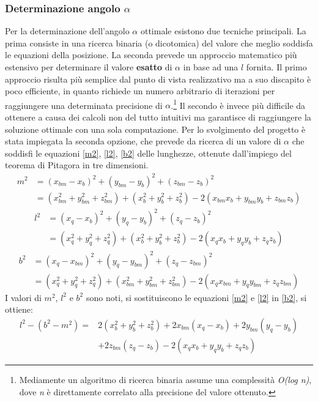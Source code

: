 \documentclass[12pt,twoside,openright]{article}
\begin{document}
\subsubsection{Determinazione angolo \boldmath$\alpha$}\label{determinazionealfa}
Per la determinazione dell'angolo $\alpha$ ottimale esistono due tecniche principali. La prima consiste in una ricerca binaria (o dicotomica) del valore che meglio soddisfa le equazioni della posizione. La seconda prevede un approccio matematico più estensivo per determinare il valore \textbf{esatto} di $\alpha$ in base ad una $l$ fornita.\cite{calcolostewart1}\cite{calcolostewart2} Il primo approccio risulta più semplice dal punto di vista realizzativo ma a suo discapito è poco efficiente, in quanto richiede un numero arbitrario di iterazioni per raggiungere una determinata precisione di $\alpha$.\footnote{Mediamente un algoritmo di ricerca binaria assume una complessità \emph{O(log n)}, dove \emph{n} è direttamente correlato alla precisione del valore ottenuto.} Il secondo è invece più difficile da ottenere a causa dei calcoli non del tutto intuitivi ma garantisce di raggiungere la soluzione ottimale con una sola computazione. Per lo svolgimento del progetto è stata impiegata la seconda opzione, che prevede da ricerca di un valore di $\alpha$ che soddisfi le equazioni \eqref{m2}, \eqref{l2}, \eqref{b2} delle lunghezze, ottenute dall'impiego del teorema di Pitagora in tre dimensioni.
\begin{align}\label{m2}
    m^2 &= (x_{bm}-x_b)^2+(y_{bm}-y_b)^2+(z_{bm}-z_b)^2\nonumber\\
    		&= (x_{bm}^2+y_{bm}^2+z_{bm}^2)+(x_{b}^2+y_{b}^2+z_{b}^2)-2(x_{bm}x_b+y_{bm}y_b+z_{bm}z_b)
\end{align}
\begin{align}\label{l2}
    l^2 &= (x_{q}-x_b)^2+(y_{q}-y_b)^2+(z_{q}-z_b)^2\nonumber\\
    		&= (x_{q}^2+y_{q}^2+z_{q}^2)+(x_{b}^2+y_{b}^2+z_{b}^2)-2(x_{q}x_b+y_{q}y_b+z_{q}z_b)
\end{align}
\begin{align}\label{b2}
    b^2 &= (x_{q}-x_{bm})^2+(y_{q}-y_{bm})^2+(z_{q}-z_{bm})^2\nonumber\\
    		&= (x_{q}^2+y_{q}^2+z_{q}^2)+(x_{bm}^2+y_{bm}^2+z_{bm}^2)-2(x_{q}x_{bm}+y_{q}y_{bm}+z_{q}z_{bm})
\end{align}
I valori di $m^2$, $l^2$ e $b^2$ sono noti, si sostituiscono le equazioni \eqref{m2} e \eqref{l2} in \eqref{b2}, si ottiene:
\begin{align}\label{passaggio}
    l^2-(b^2-m^2) =& 2(x_{b}^2+y_{b}^2+z_{b}^2)+2x_{bm}(x_q-x_b)+2y_{bm}(y_q-y_b)\nonumber \\&+2z_{bm}(z_q-z_b)-2(x_qx_b+y_qy_b+z_qz_b)
\end{align}
\end{document}
